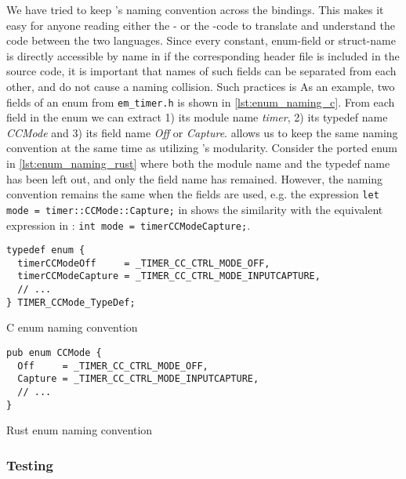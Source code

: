 We have tried to keep \emlib's naming convention across the bindings. This makes it easy for anyone
reading either the \C- or the \rust-code to translate and understand the code between the two
languages. Since every constant, enum-field or struct-name is directly accessible by name in \C if
the corresponding header file is included in the source code, it is important that names of such
fields can be separated from each other, and do not cause a naming collision. Such practices is  As an example, two
fields of an enum from \texttt{em\_timer.h} is shown in \autoref{lst:enum_naming_c}. From each field in
the enum we can extract 1) its module name \textit{timer}, 2) its typedef name \textit{CCMode} and
3) its field name \textit{Off} or \textit{Capture}. \rust allows us to keep the same naming
convention at the same time as utilizing \rust's modularity. Consider the ported enum in
\autoref{lst:enum_naming_rust} where both the module name and the typedef name has been left out,
and only the field name has remained. However, the naming convention remains the same when the
fields are used, e.g. the expression \texttt{let mode = timer::CCMode::Capture;} in \rust shows the
similarity with the equivalent expression in \C: \texttt{int mode = timerCCModeCapture;}.



\begin{listing}[tb]
\begin{verbatim}
typedef enum {
  timerCCModeOff     = _TIMER_CC_CTRL_MODE_OFF,
  timerCCModeCapture = _TIMER_CC_CTRL_MODE_INPUTCAPTURE,
  // ...
} TIMER_CCMode_TypeDef;
\end{verbatim}
\caption{C enum naming convention}
\label{lst:enum_naming_c}
\end{listing}

\begin{listing}[tb]
\begin{verbatim}
pub enum CCMode {
  Off     = _TIMER_CC_CTRL_MODE_OFF,
  Capture = _TIMER_CC_CTRL_MODE_INPUTCAPTURE,
  // ...
}
\end{verbatim}
\caption{Rust enum naming convention}
\label{lst:enum_naming_rust}
\end{listing}


\subsubsection{Testing}
\label{ssub:testing}



